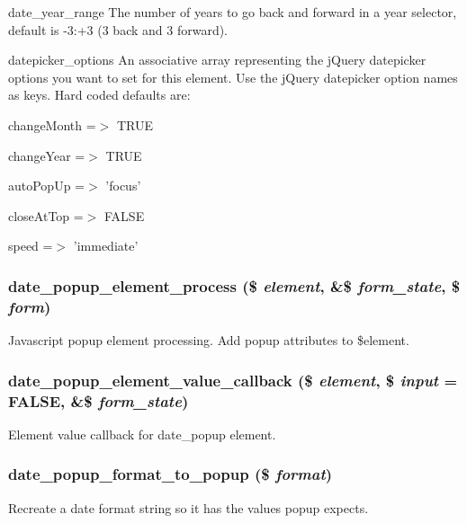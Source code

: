 date\_\-year\_\-range The number of years to go back and forward in a year selector, default is -\/3:+3 (3 back and 3 forward).

datepicker\_\-options An associative array representing the jQuery datepicker options you want to set for this element. Use the jQuery datepicker option names as keys. Hard coded defaults are:
\begin{DoxyItemize}
\item changeMonth =$>$ TRUE
\item changeYear =$>$ TRUE
\item autoPopUp =$>$ 'focus'
\item closeAtTop =$>$ FALSE
\item speed =$>$ 'immediate' 
\end{DoxyItemize}\hypertarget{date__popup_8module_a1c48e05ba3b84ea7170f70091a3893d2}{
\subsubsection[{date\_\-popup\_\-element\_\-process}]{\setlength{\rightskip}{0pt plus 5cm}date\_\-popup\_\-element\_\-process (\$ {\em element}, \/  \&\$ {\em form\_\-state}, \/  \$ {\em form})}}
\label{date__popup_8module_a1c48e05ba3b84ea7170f70091a3893d2}
Javascript popup element processing. Add popup attributes to \$element. \hypertarget{date__popup_8module_a9c101bfe3a097b79e1c97c19f8907d2b}{
\subsubsection[{date\_\-popup\_\-element\_\-value\_\-callback}]{\setlength{\rightskip}{0pt plus 5cm}date\_\-popup\_\-element\_\-value\_\-callback (\$ {\em element}, \/  \$ {\em input} = {\ttfamily FALSE}, \/  \&\$ {\em form\_\-state})}}
\label{date__popup_8module_a9c101bfe3a097b79e1c97c19f8907d2b}
Element value callback for date\_\-popup element. \hypertarget{date__popup_8module_a271d1860d9abc66d5eb49445f2c942e6}{
\subsubsection[{date\_\-popup\_\-format\_\-to\_\-popup}]{\setlength{\rightskip}{0pt plus 5cm}date\_\-popup\_\-format\_\-to\_\-popup (\$ {\em format})}}
\label{date__popup_8module_a271d1860d9abc66d5eb49445f2c942e6}
Recreate a date format string so it has the values popup expects.


